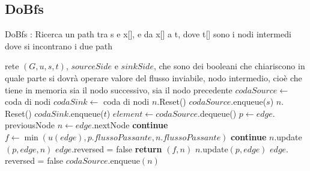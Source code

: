 \documentclass{article}
\begin{document}
\subsection{DoBfs}
\begin{algorithm}
\caption{DoBfs : Ricerca un path tra s e x[], e da x[] a t, dove t[] sono i nodi intermedi dove si incontrano i due path}
\begin{algorithmic}[1]
\REQUIRE rete $(G,u,s,t)$, $sourceSide$ e $sinkSide$, che sono dei booleani che chiariscono in quale parte si dovrà operare
\ENSURE valore del flusso inviabile, nodo intermedio, cioè che tiene in memoria sia il nodo successivo, sia il nodo precedente 
\STATE $codaSource \leftarrow$ coda di nodi
\STATE $codaSink \leftarrow$ coda di nodi
\STATE $n.$Reset()
\ENDFOR
\STATE $codaSource.$enqueue($s$)
\ENDIF
{}
\STATE $n.$Reset()
\ENDFOR
\STATE $codaSink$.enqueue($t$)
\ENDIF
\STATE{}
\STATE $element \leftarrow codaSource$.dequeue()
\STATE $p \leftarrow edge.$previousNode
\STATE $n \leftarrow edge.$nextNode
\STATE \textbf{continue}
\ELSE
\STATE $f \leftarrow \min(u(edge),p.flussoPassante,n.flussoPassante)$
\STATE \textbf{continue}
\ENDIF
\STATE $n.$update$(p,edge,n)$
\STATE $edge.$reversed = false
\STATE \textbf{return} $(f,n)$
\ENDIF
\ENDIF
\STATE $n.$update$(p,edge)$
\STATE $edge.$reversed = false
\STATE $codaSource$.enqueue$(n)$
\ENDIF
{}
\end{algorithmic}
\end{algorithm}
\newpage
\end{document}
